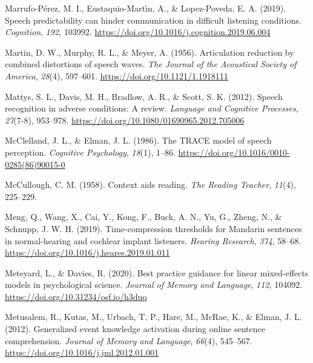\documentclass[a4paper, nobind]{templates/ociamthesis}
\newlength{\cslhangindent}
\newenvironment{CSLReferences}[2] %
 {%
  \setlength{\parindent}{0pt}
  \ifodd #1
  \let\oldpar\par
  \def\par{\hangindent=\cslhangindent\oldpar}
  \fi
  \setlength{\parskip}{1mm}
  \setlength{\baselineskip}{6mm}
 }%
 {}
\begin{document}
\begin{CSLReferences}{1}{0}
\leavevmode{}%
Marrufo-Pérez, M. I., Eustaquio-Martı́n, A., \& Lopez-Poveda, E. A. (2019). Speech predictability can hinder communication in difficult listening conditions. \emph{Cognition}, \emph{192}, 103992. \url{https://doi.org/10.1016/j.cognition.2019.06.004}

\leavevmode{}%
Martin, D. W., Murphy, R. L., \& Meyer, A. (1956). {Articulation reduction by combined distortions of speech waves}. \emph{The Journal of the Acoustical Society of America}, \emph{28}(4), 597--601. \url{https://doi.org/10.1121/1.1918111}

\leavevmode{}%
Mattys, S. L., Davis, M. H., Bradlow, A. R., \& Scott, S. K. (2012). {Speech recognition in adverse conditions: A review}. \emph{Language and Cognitive Processes}, \emph{27}(7-8), 953--978. \url{https://doi.org/10.1080/01690965.2012.705006}

\leavevmode{}%
McClelland, J. L., \& Elman, J. L. (1986). {The TRACE model of speech perception}. \emph{Cognitive Psychology}, \emph{18}(1), 1--86. \url{https://doi.org/10.1016/0010-0285(86)90015-0}

\leavevmode{}%
McCullough, C. M. (1958). {Context aids reading}. \emph{The Reading Teacher}, \emph{11}(4), 225--229.

\leavevmode{}%
Meng, Q., Wang, X., Cai, Y., Kong, F., Buck, A. N., Yu, G., Zheng, N., \& Schnupp, J. W. H. (2019). {Time-compression thresholds for Mandarin sentences in normal-hearing and cochlear implant listeners}. \emph{Hearing Research}, \emph{374}, 58--68. \url{https://doi.org/10.1016/j.heares.2019.01.011}

\leavevmode{}%
Meteyard, L., \& Davies, R. (2020). {Best practice guidance for linear mixed-effects models in psychological science}. \emph{Journal of Memory and Language}, \emph{112}, 104092. \url{https://doi.org/10.31234/osf.io/h3duq}

\leavevmode{}%
Metusalem, R., Kutas, M., Urbach, T. P., Hare, M., McRae, K., \& Elman, J. L. (2012). Generalized event knowledge activation during online sentence comprehension. \emph{Journal of Memory and Language}, \emph{66}(4), 545--567. \url{https://doi.org/10.1016/j.jml.2012.01.001}


\end{CSLReferences}
\end{document}
